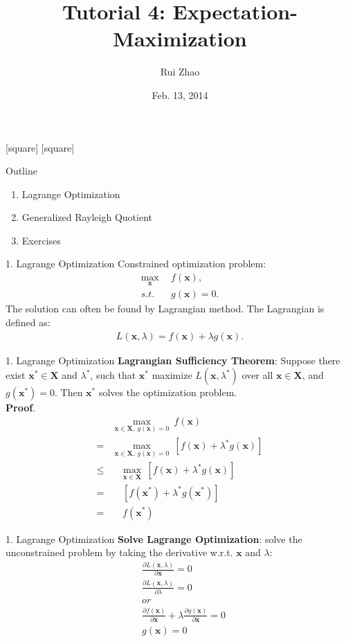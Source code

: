 \documentclass[compress,blue]{beamer}
\title[ENGG 5202 Pattern Recognition Tutorial 4]{Tutorial 4: Expectation-Maximization}
\author{Rui Zhao}
\institute{rzhao@ee.cuhk.edu.hk}
\date{Feb. 13, 2014}
\newcommand{\bx}{\mathbf{x}}
\newcommand{\bX}{\mathbf{X}}
\begin{document}
\begin{frame}
\titlepage
\end{frame}

[square]
[square]

\begin{frame}{Outline}
	\begin{enumerate}
		\item<1-2> Lagrange Optimization
		\vspace{0.1in}
		\item<1> Generalized Rayleigh Quotient 
		\vspace{0.1in}
		\item<1> Exercises 
	\end{enumerate}
\end{frame}

\begin{frame}{1. Lagrange Optimization}
	Constrained optimization problem:
	\begin{align}
		\max_{\bx} ~&~ f(\bx), \\
		s.t. ~&~ g(\bx) = 0.
	\end{align}
	The solution can often be found by Lagrangian method. The Lagrangian is defined as:
	\begin{align}
		L(\bx, \lambda) = f(\bx) + \lambda g(\bx).
	\end{align}
\end{frame}

\begin{frame}{1. Lagrange Optimization}
	\textbf{Lagrangian Sufficiency Theorem}: Suppose there exist $\bx^* \in \bX$ and $\lambda^*$, such that $\bx^*$ maximize $L(\bx, \lambda^*)$ over all $\bx \in \bX$, and $g(\bx^*) = 0$. Then $\bx^*$ solves the optimization problem. \\
	\vspace{0.1in}
	\textbf{Proof}. 
	\begin{align}
		& \max_{\bx\in\bX, ~g(\bx) = 0} ~f(\bx)\\
		=& \max_{\bx\in\bX, ~g(\bx) = 0} ~[f(\bx) + \lambda^* g(\bx)] \\
		\leq &~~~~ \max_{\bx\in\bX} ~[f(\bx) + \lambda^* g(\bx)] \\
		= & ~~~~ ~[f(\bx^*) + \lambda^* g(\bx^*)] \\
		= & ~~~~ ~ f(\bx^*)
	\end{align} 
\end{frame}

\begin{frame}{1. Lagrange Optimization}
	\textbf{Solve Lagrange Optimization}: solve the unconstrained problem by taking the derivative w.r.t. $\bx$ and $\lambda$:
	\begin{align}
		&\frac{\partial L(\bx, \lambda)}{\partial \bx}  = 0 \\
		&\frac{\partial L(\bx, \lambda)}{\partial \lambda} = 0 \\
		&or \\
		&\frac{\partial f(\bx)}{\partial \bx} + \lambda\frac{\partial g(\bx)}{\partial \bx} = 0\\
		&g(\bx) = 0
	\end{align}
\end{frame}
\end{document}
